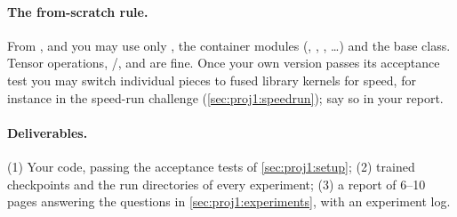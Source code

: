 \paragraph{The from-scratch rule.} From ,  and
 you may use only , the container modules (,
, , \ldots) and the  base class. Tensor
operations, /, and  are fine. Once your own version
passes its acceptance test you may switch individual pieces to fused library kernels for speed,
for instance in the speed-run challenge (\cref{sec:proj1:speedrun}); say so in your report.

\paragraph{Deliverables.} (1) Your code, passing the acceptance tests of \cref{sec:proj1:setup};
(2) trained checkpoints and the run directories of every experiment; (3) a report of 6--10 pages
answering the questions in \cref{sec:proj1:experiments}, with an experiment log.

